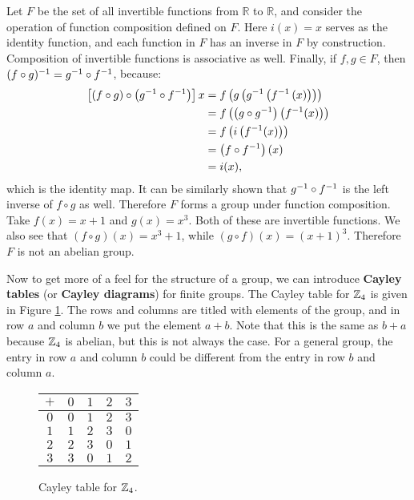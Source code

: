 \begin{example}
Let $F$ be the set of all invertible functions from $\mathbb{R}$ to $\mathbb{R}$, and consider the operation of function composition defined on $F$. Here $i(x) = x$ serves as the identity function, and each function in $F$ has an inverse in $F$ by construction. Composition of invertible functions is associative as well. Finally, if $f, g \in F$, then $\inv{(f \circ g)} = \inv g \circ \inv f$, because: 
\begin{align*}
\left[(f \circ g) \circ \left(\inv g \circ \inv f\right)\right]x &= f\left(g\left(\inv g\left(\inv f \left(x\right)\right)\right)\right) \\
 &= f\left(\left(g \circ \inv g\right)\left(\inv f(x)\right)\right) \\
 &= f\left(i\left(\inv f(x)\right)\right) \\
 &= \left(f \circ \inv f\right)(x) \\
 &= i(x)\mathrm{,}
\end{align*}
which is the identity map. It can be similarly shown that $\inv g \circ \inv f$ is the left inverse of $f \circ g$ as well. Therefore $F$ forms a group under function composition. Take $f(x) = x+1$ and $g(x) = x^3$. Both of these are invertible functions. We also see that $(f \circ g)(x) = x^3 + 1$, while $(g \circ f)(x) = (x+1)^3$. Therefore $F$ is not an abelian group.
\end{example}

Now \extra to get more of a feel for the structure of a group, we can introduce \textbf{Cayley tables} (or \textbf{Cayley diagrams}) for finite groups. The Cayley table for $\zn[4]$ is given in Figure \ref{z4}. The rows and columns are titled with elements of the group, and in row $a$ and column $b$ we put the element $a + b$. Note that this is the same as $b + a$ because $\zn[4]$ is abelian, but this is not always the case. For a general group, the entry in row $a$ and column $b$ could be different from the entry in row $b$ and column $a$.

\begin{figure}[ht]
\centering
\begin{tabular}{c | c c c c}
    $+$ & $0$ & $1$ & $2$ & $3$ \\
    \hline
    $0$ & $0$ & $1$ & $2$ & $3$ \\
    $1$ & $1$ & $2$ & $3$ & $0$ \\
    $2$ & $2$ & $3$ & $0$ & $1$ \\
    $3$ & $3$ & $0$ & $1$ & $2$
\end{tabular}
\caption{Cayley table for $\zn[4]$.}
\label{z4}
\end{figure}

